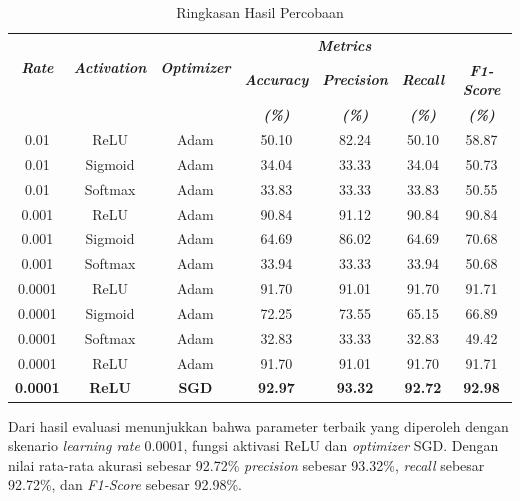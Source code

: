 \begin{table}[H]
    \centering
    \caption{Ringkasan Hasil Percobaan}
    \begin{tabular}{ccccccc}
        \toprule
        \multirow{2}{*}{\textbf{\textit{Rate}}} & \multirow{2}{*}{\textbf{\textit{Activation}}} & \multirow{2}{*}{\textbf{\textit{Optimizer}}} & \multicolumn{3}{c}{\textbf{\textit{Metrics}}} \\
        \cmidrule{4-7}
        & & & \textbf{\textit{Accuracy}} & \textbf{\textit{Precision}} & \textbf{\textit{Recall}} & \textbf{\textit{F1-Score}} \\
        & & & \textbf{\textit{(\%)}} & \textbf{\textit{(\%)}} & \textbf{\textit{(\%)}} & \textbf{\textit{(\%)}} \\
        \midrule
        0.01 & ReLU   & Adam  & 50.10 & 82.24 & 50.10 & 58.87\\
        0.01 & Sigmoid & Adam  & 34.04 & 33.33 & 34.04 & 50.73 \\
        0.01 & Softmax & Adam  & 33.83 & 33.33 & 33.83 & 50.55\\
        \midrule
        0.001 & ReLU    & Adam  & 90.84 & 91.12 & 90.84 & 90.84\\
        0.001 & Sigmoid & Adam  & 64.69 & 86.02 & 64.69 & 70.68 \\
        0.001 & Softmax & Adam  & 33.94 & 33.33 & 33.94 & 50.68\\
        \midrule
        0.0001 & ReLU & Adam  & 91.70 & 91.01 & 91.70 & 91.71\\
        0.0001 & Sigmoid & Adam  & 72.25 & 73.55 & 65.15 & 66.89\\
        0.0001 & Softmax & Adam & 32.83 & 33.33 & 32.83 & 49.42\\
        \midrule
        0.0001 & ReLU & Adam  & 91.70 & 91.01 & 91.70 & 91.71\\
        \textbf{0.0001} & \textbf{ReLU} & \textbf{SGD} & \textbf{92.97} & \textbf{93.32} & \textbf{92.72} & \textbf{92.98}\\
        \bottomrule
    \end{tabular}
    \label{Ringkasan Hasil Percobaan}
\end{table}


    Dari hasil evaluasi menunjukkan bahwa parameter terbaik yang diperoleh dengan skenario \textit{learning rate} 0.0001, fungsi aktivasi ReLU dan \textit{optimizer} SGD. Dengan nilai rata-rata akurasi sebesar 92.72\% \textit{precision} sebesar 93.32\%, \textit{recall} sebesar 92.72\%, dan \textit{F1-Score} sebesar 92.98\%.


